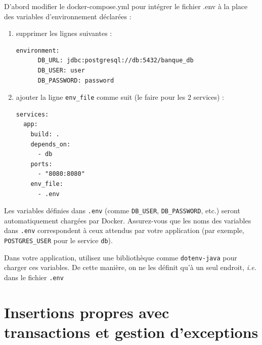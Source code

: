 \documentclass[11pt]{article}
\begin{document}
D'abord modifier le docker-compose.yml pour intégrer le fichier .env à la place des variables d'environnement déclarées : 
\begin{enumerate}
\item supprimer les lignes suivantes :
\begin{lstlisting}
environment:
      DB_URL: jdbc:postgresql://db:5432/banque_db
      DB_USER: user
      DB_PASSWORD: password
\end{lstlisting}
\item ajouter la ligne \texttt{env\_file} comme suit (le faire pour les 2 services) :
\begin{lstlisting}
services:
  app:
    build: .
    depends_on:
      - db
    ports:
      - "8080:8080"
    env_file:
      - .env
\end{lstlisting}
\end{enumerate}
Les variables définies dans \texttt{.env} (comme \texttt{DB\_USER}, \texttt{DB\_PASSWORD}, etc.) seront automatiquement chargées par Docker.
Assurez-vous que les noms des variables dans \texttt{.env} correspondent à ceux attendus par votre application (par exemple, \texttt{POSTGRES\_USER} pour le service \texttt{db}).

Dans votre application, utilisez une bibliothèque comme \texttt{dotenv-java} pour charger ces variables. De cette manière, on ne les définit qu'à un seul endroit, \textit{i.e.} dans le fichier \texttt{.env}

\section{Insertions propres avec transactions et gestion d’exceptions}
\end{document}

